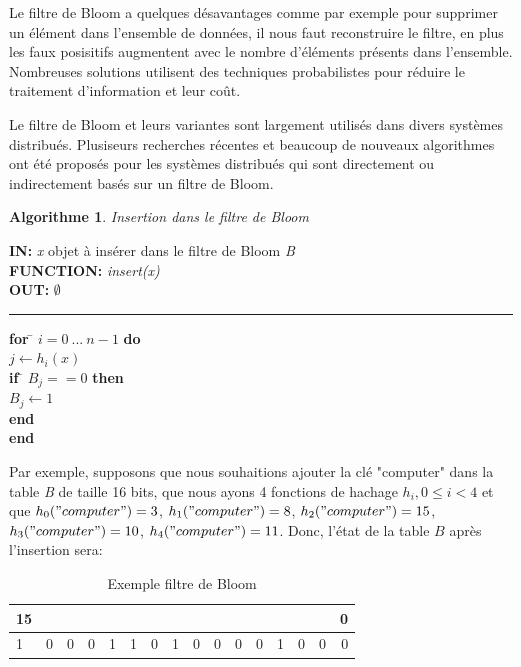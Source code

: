	Le filtre de Bloom a quelques désavantages comme par exemple pour supprimer un élément dans l'ensemble de données, il nous faut reconstruire le filtre, en plus les faux posisitifs augmentent avec le nombre d'éléments présents dans l'ensemble. Nombreuses solutions utilisent des techniques probabilistes pour réduire le traitement d'information et leur coût.
	
	Le filtre de Bloom et leurs variantes sont largement utilisés dans divers systèmes distribués. Plusiseurs recherches récentes et beaucoup de nouveaux algorithmes ont été proposés pour les systèmes distribués qui sont directement ou indirectement basés sur un filtre de Bloom\cite{theory-and-practice-of-bloom-filters-for-distributed-systems}.
	
\newtheorem{algorithme}{Algorithme}
\begin{algorithme}
	Insertion dans le filtre de Bloom
\end{algorithme}

\begin{flushleft}
	\begin{framed}
		\textbf{IN:} \textit{x} objet à insérer dans le filtre de Bloom \textit{B}\\
		\textbf{FUNCTION:} \textit{insert(x)}\\
		\textbf{OUT:} $\emptyset$
		\noindent\rule{\linewidth}{0.5pt}

		\begin{tabbing}
			\textbf{for} \= $i = 0\ ...\ n - 1$ \textbf{do}\\
					\> $j \leftarrow h_i(x)$\\
					\> \textbf{if} \= $B_j == 0$ \textbf{then}\\
					\> \> $B_j \leftarrow 1$\\
					\> \textbf{end}\\
			\textbf{end}
	    	\end{tabbing}		
	\end{framed}
\end{flushleft}
	
	Par exemple, supposons que nous souhaitions ajouter la clé "computer" dans la table \textit{B} de taille 16 bits, que nous ayons 4 fonctions de hachage $ h_i, 0 \leq i < 4 $ et que $ h_0("computer") = 3$, $ h_1("computer") = 8$, $ h_2("computer") = 15$, $h_3("computer") = 10$, $h_4("computer") = 11 $. Donc, l'état de la table $ B $ après l'insertion sera:
	\begin{table}[!h]
		\centering		
		\begin{tabular}{|l|*{14}{c|}r|}
		\multicolumn{1}{c}{{\scriptsize 15}} &\multicolumn{1}{c}{}&\multicolumn{1}{c}{}&\multicolumn{1}{c}{}&\multicolumn{1}{c}{}&\multicolumn{1}{c}{}&\multicolumn{1}{c}{}&\multicolumn{1}{c}{}&\multicolumn{1}{c}{}&\multicolumn{1}{c}{}&\multicolumn{1}{c}{}&\multicolumn{1}{c}{}&\multicolumn{1}{c}{}&\multicolumn{1}{c}{}&\multicolumn{1}{c}{}&\multicolumn{1}{c}{{\scriptsize 0}}\\
		\hline
			1 & 0 & 0 & 0 & 1 & 1 & 0 & 1 & 0 & 0 & 0 & 0 & 1 & 0 & 0 & 0 \\
		\hline
		\end{tabular}
		\caption{Exemple filtre de Bloom}
		\label{filtredeBloom/exemple}
	\end{table}
	
